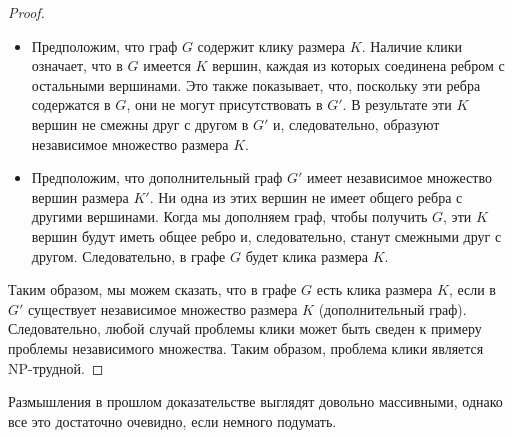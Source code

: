 \begin{proof}
\begin{itemize}
            \item Предположим, что граф $G$ содержит клику размера $K$. Наличие клики означает, что в $G$ имеется $K$ вершин, каждая из которых соединена ребром с остальными вершинами. Это также показывает, что, поскольку эти ребра содержатся в $G$, они не могут присутствовать в $G'$. В результате эти $K$ вершин не смежны друг с другом в $G'$ и, следовательно, образуют независимое множество размера $K$.
            \item Предположим, что дополнительный граф $G'$ имеет независимое множество вершин размера $K'$. Ни одна из этих вершин не имеет общего ребра с другими вершинами. Когда мы дополняем граф, чтобы получить $G$, эти $K$ вершин будут иметь общее ребро и, следовательно, станут смежными друг с другом. Следовательно, в графе $G$ будет клика размера $K$.
        \end{itemize}
        Таким образом, мы можем сказать, что в графе $G$ есть клика размера $K$, если в $G'$ существует независимое множество размера $K$ (дополнительный граф). Следовательно, любой случай проблемы клики может быть сведен к примеру проблемы независимого множества. Таким образом, проблема клики является NP-трудной.
    \end{proof}
    \begin{Rem}
        Размышления в прошлом доказательстве выглядят довольно массивными, однако все это достаточно очевидно, если немного подумать.
    \end{Rem}
